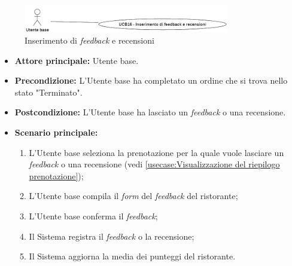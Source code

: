 \newpage
{}
\label{usecase:Inserimento di feedback e recensioni}

\begin{figure}[h]
	\centering
	\includegraphics[width=0.8\textwidth]{./uml/UCB16.png} 
	\caption{Inserimento di \textit{feedback} e recensioni}
	\label{fig:UCB16}
  \end{figure}

\begin{itemize}
	\item \textbf{Attore principale:} Utente base.

	\item \textbf{Precondizione:} L'Utente base ha completato un ordine che si
	      trova nello stato "Terminato".

	\item \textbf{Postcondizione:} L'Utente base ha lasciato un \textit{feedback} o una recensione.

	\item \textbf{Scenario principale:}
	      \begin{enumerate}
		      \item L'Utente base seleziona la prenotazione per la quale vuole
		            lasciare un \textit{feedback} o una recensione (vedi
		            \autoref{usecase:Visualizzazione del riepilogo prenotazione});

		      \item L'Utente base compila il \textit{form} del \textit{feedback} del ristorante;

		      \item L'Utente base conferma il \textit{feedback};

		      \item Il Sistema registra il \textit{feedback} o la recensione;

		      \item Il Sistema aggiorna la media dei punteggi del ristorante.

	      \end{enumerate}
\end{itemize}
